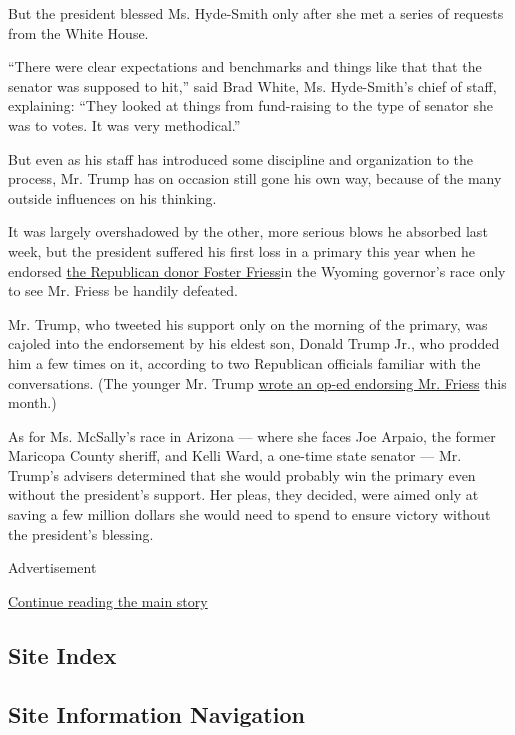 But the president blessed Ms. Hyde-Smith only after she met a series of
requests from the White House.

``There were clear expectations and benchmarks and things like that that
the senator was supposed to hit,'' said Brad White, Ms. Hyde-Smith's
chief of staff, explaining: ``They looked at things from fund-raising to
the type of senator she was to votes. It was very methodical.''

But even as his staff has introduced some discipline and organization to
the process, Mr. Trump has on occasion still gone his own way, because
of the many outside influences on his thinking.

It was largely overshadowed by the other, more serious blows he absorbed
last week, but the president suffered his first loss in a primary this
year when he endorsed
\href{https://www.nytimes3xbfgragh.onion/2018/08/21/us/politics/wyoming-foster-friess.html}{the
Republican donor Foster Friess}in the Wyoming governor's race only to
see Mr. Friess be handily defeated.

Mr. Trump, who tweeted his support only on the morning of the primary,
was cajoled into the endorsement by his eldest son, Donald Trump Jr.,
who prodded him a few times on it, according to two Republican officials
familiar with the conversations. (The younger Mr. Trump
\href{https://trib.com/opinion/columns/trump-jr-friess-right-choice-for-wyoming/article_94e2311c-cad9-53d5-b72d-651c95190986.html}{wrote
an op-ed endorsing Mr. Friess} this month.)

As for Ms. McSally's race in Arizona --- where she faces Joe Arpaio, the
former Maricopa County sheriff, and Kelli Ward, a one-time state senator
--- Mr. Trump's advisers determined that she would probably win the
primary even without the president's support. Her pleas, they decided,
were aimed only at saving a few million dollars she would need to spend
to ensure victory without the president's blessing.

Advertisement

\protect\hyperlink{after-bottom}{Continue reading the main story}

\hypertarget{site-index}{%
\subsection{Site Index}\label{site-index}}

\hypertarget{site-information-navigation}{%
\subsection{Site Information
Navigation}\label{site-information-navigation}}

